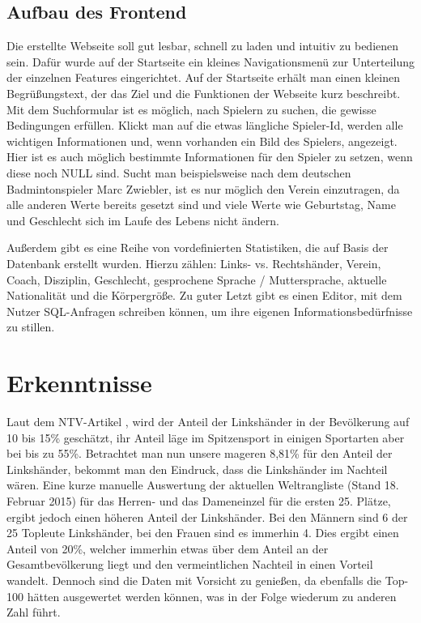 \documentclass[12pt,a4paper]{scrreprt}
\begin{document}
\section{Aufbau des Frontend}
\label{Frontend}
Die erstellte Webseite soll gut lesbar, schnell zu laden und intuitiv zu bedienen sein. Dafür wurde auf der Startseite ein kleines Navigationsmenü zur Unterteilung der einzelnen Features eingerichtet. Auf der Startseite erhält man einen kleinen Begrüßungstext, der das Ziel und die Funktionen der Webseite kurz beschreibt. Mit dem Suchformular ist es möglich, nach Spielern zu suchen, die gewisse Bedingungen erfüllen. Klickt man auf die etwas längliche Spieler-Id, werden alle wichtigen Informationen und, wenn vorhanden ein Bild des Spielers, angezeigt. Hier ist es auch möglich bestimmte Informationen für den Spieler zu setzen, wenn diese noch \glqq NULL\grqq{} sind. Sucht man beispielsweise nach dem deutschen Badmintonspieler Marc Zwiebler, ist es nur möglich den Verein einzutragen, da alle anderen Werte bereits gesetzt sind und viele Werte wie Geburtstag, Name und Geschlecht sich im Laufe des Lebens nicht ändern.

Außerdem gibt es eine Reihe von vordefinierten Statistiken, die auf Basis der Datenbank erstellt wurden. Hierzu zählen:
Links- vs. Rechtshänder, Verein, Coach, Disziplin, Geschlecht, gesprochene Sprache / Muttersprache, aktuelle Nationalität und die Körpergröße. Zu guter Letzt gibt es einen Editor, mit dem Nutzer SQL-Anfragen schreiben können, um ihre eigenen Informationsbedürfnisse zu stillen.

\chapter{Erkenntnisse}
\label{Erkenntnisse}
Laut dem NTV-Artikel \cite{Hand2015}, wird der Anteil der Linkshänder in der Bevölkerung auf 10 bis 15\% geschätzt, ihr Anteil läge im Spitzensport in einigen Sportarten aber bei bis zu 55\%. Betrachtet man nun unsere mageren 8,81\% für den Anteil der Linkshänder, bekommt man den Eindruck, dass die Linkshänder im Nachteil wären. Eine kurze manuelle Auswertung der aktuellen Weltrangliste (Stand 18. Februar 2015) für das Herren- und das Dameneinzel für die ersten 25. Plätze, ergibt jedoch einen höheren Anteil der Linkshänder. Bei den Männern sind 6 der 25 Topleute Linkshänder, bei den Frauen sind es immerhin 4. Dies ergibt einen Anteil von 20\%, welcher immerhin etwas über dem Anteil an der Gesamtbevölkerung liegt und den vermeintlichen Nachteil in einen Vorteil wandelt. Dennoch sind die Daten mit Vorsicht zu genießen, da ebenfalls die Top-100 hätten ausgewertet werden können, was in der Folge wiederum zu anderen Zahl führt.
\end{document}
